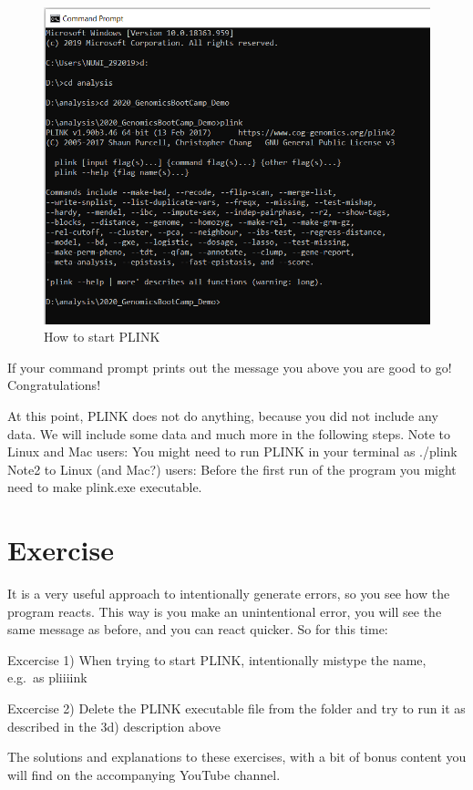 \documentclass[]{book}
\begin{document}
\begin{figure}
\includegraphics[width=10.79in]{images/4-4-runPlink} \caption{How to start PLINK}\label{fig:fig4-4}
\end{figure}

If your command prompt prints out the message you above you are good to
go! Congratulations!

At this point, PLINK does not do anything, because you did not include
any data. We will include some data and much more in the following
steps. Note to Linux and Mac users: You might need to run PLINK in your
terminal as ./plink Note2 to Linux (and Mac?) users: Before the first
run of the program you might need to make plink.exe executable.

\section{Exercise}\label{exercise}

It is a very useful approach to intentionally generate errors, so you
see how the program reacts. This way is you make an unintentional error,
you will see the same message as before, and you can react quicker. So
for this time:

Excercise 1) When trying to start PLINK, intentionally mistype the name,
e.g.~as pliiiink

Excercise 2) Delete the PLINK executable file from the folder and try to
run it as described in the 3d) description above

The solutions and explanations to these exercises, with a bit of bonus
content you will find on the accompanying YouTube channel.
\end{document}
